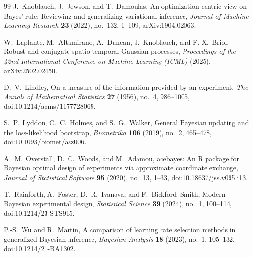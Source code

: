 \documentclass[11pt,a4paper,reqno]{amsart}
\theoremstyle{definition}
\theoremstyle{remark}
\begin{document}
\begin{thebibliography}{99}
J.~Knoblauch, J.~Jewson, and T.~Damoulas,
\newblock An optimization-centric view on Bayes' rule: Reviewing and generalizing variational inference,
\newblock \emph{Journal of Machine Learning Research} \textbf{23} (2022), no.~132, 1--109, arXiv:1904.02063.

W.~Laplante, M.~Altamirano, A.~Duncan, J.~Knoblauch, and F.-X.~Briol,
\newblock Robust and conjugate spatio-temporal Gaussian processes,
\newblock \emph{Proceedings of the 42nd International Conference on Machine Learning (ICML)} (2025), arXiv:2502.02450.

D.~V.~Lindley,
\newblock On a measure of the information provided by an experiment,
\newblock \emph{The Annals of Mathematical Statistics} \textbf{27} (1956), no.~4, 986--1005, doi:10.1214/aoms/1177728069.

S.~P.~Lyddon, C.~C.~Holmes, and S.~G.~Walker,
\newblock General Bayesian updating and the loss-likelihood bootstrap,
\newblock \emph{Biometrika} \textbf{106} (2019), no.~2, 465--478, doi:10.1093/biomet/asz006.

A.~M.~Overstall, D.~C.~Woods, and M.~Adamou,
\newblock acebayes: An {R} package for Bayesian optimal design of experiments via approximate coordinate exchange,
\newblock \emph{Journal of Statistical Software} \textbf{95} (2020), no.~13, 1--33, doi:10.18637/jss.v095.i13.

T.~Rainforth, A.~Foster, D.~R.~Ivanova, and F.~Bickford~Smith,
\newblock Modern Bayesian experimental design,
\newblock \emph{Statistical Science} \textbf{39} (2024), no.~1, 100--114, doi:10.1214/23-STS915.

P.-S.~Wu and R.~Martin,
\newblock A comparison of learning rate selection methods in generalized Bayesian inference,
\newblock \emph{Bayesian Analysis} \textbf{18} (2023), no.~1, 105--132, doi:10.1214/21-BA1302.

\end{thebibliography}
\end{document}
